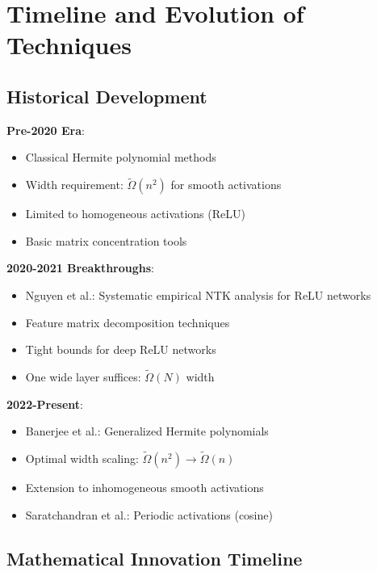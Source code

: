 \documentclass{article}
\newcommand{\TildeOmega}{\tilde{\Omega}}
\begin{document}
\section{Timeline and Evolution of Techniques}

\subsection{Historical Development}

\textbf{Pre-2020 Era}:
\begin{itemize}
    \item Classical Hermite polynomial methods
    \item Width requirement: $\TildeOmega(n^2)$ for smooth activations
    \item Limited to homogeneous activations (ReLU)
    \item Basic matrix concentration tools
\end{itemize}

\textbf{2020-2021 Breakthroughs}:
\begin{itemize}
    \item Nguyen et al.: Systematic empirical NTK analysis for ReLU networks
    \item Feature matrix decomposition techniques
    \item Tight bounds for deep ReLU networks
    \item One wide layer suffices: $\TildeOmega(N)$ width
\end{itemize}

\textbf{2022-Present}:
\begin{itemize}
    \item Banerjee et al.: Generalized Hermite polynomials
    \item Optimal width scaling: $\TildeOmega(n^2) \rightarrow \TildeOmega(n)$
    \item Extension to inhomogeneous smooth activations
    \item Saratchandran et al.: Periodic activations (cosine)
\end{itemize}

\subsection{Mathematical Innovation Timeline}
\end{document}
